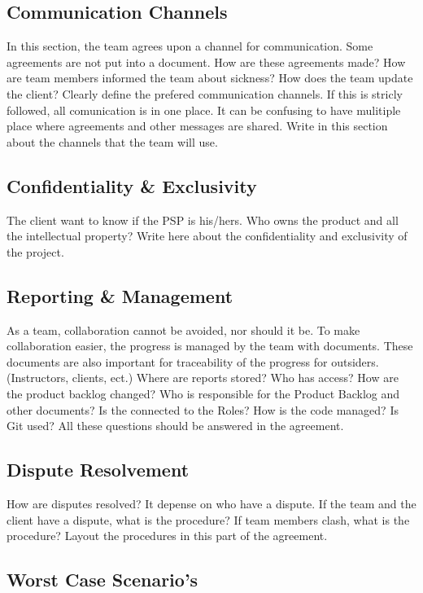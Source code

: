 \documentclass[10pt]{report}
\begin{document}
\subsection{Communication Channels}

In this section, the team agrees upon a channel for communication. Some agreements are not put into a document. How are these agreements made? How are team members informed the team about sickness? How does the team update the client? Clearly define the prefered communication channels. If this is stricly followed, all comunication is in one place. It can be confusing to have mulitiple place where agreements and other messages are shared. Write in this section about the channels that the team will use.

\subsection{Confidentiality \& Exclusivity}

The client want to know if the PSP is his/hers. Who owns the product and all the intellectual property? Write here about the confidentiality and exclusivity of the project.

\subsection{Reporting \& Management}

As a team, collaboration cannot be avoided, nor should it be. To make collaboration easier, the progress is managed by the team with documents. These documents are also important for traceability of the progress for outsiders. (Instructors, clients, ect.) Where are reports stored? Who has access? How are the product backlog changed? Who is responsible for the Product Backlog and other documents? Is the connected to the Roles? How is the code managed? Is Git used? All these questions should be answered in the agreement.

\subsection{Dispute Resolvement}

How are disputes resolved? It depense on who have a dispute. If the team and the client have a dispute, what is the procedure? If team members clash, what is the procedure? Layout the procedures in this part of the agreement.

\subsection{Worst Case Scenario's}
\end{document}
